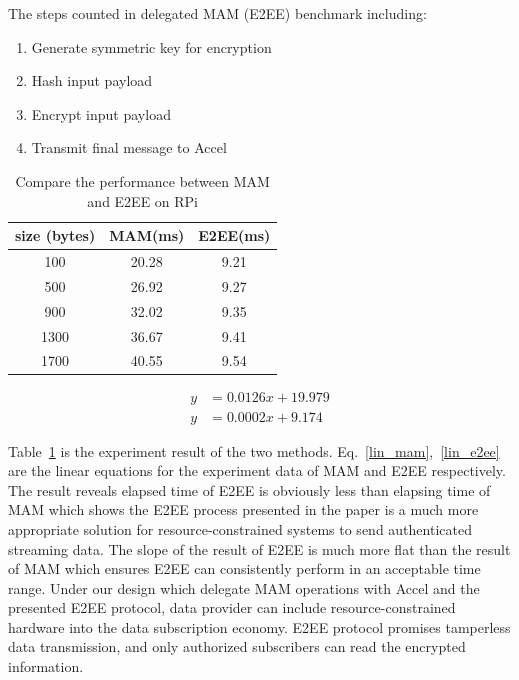 \documentclass[conference]{IEEEtran}
\begin{document}
The steps counted in delegated MAM (E2EE) benchmark including:
\begin{enumerate}
	\item Generate symmetric key for encryption
	\item Hash input payload
	\item Encrypt input payload
	\item Transmit final message to Accel
\end{enumerate}

\begin{table}[htbp]
	\caption{Compare the performance between MAM and E2EE on RPi}
    \label{tab:mam_vs_e2ee}
    \centering
        \begin{tabular}{|c||c|c|}
        \hline
            \textbf{size (bytes)} & \textbf{MAM(ms)} & \textbf{E2EE(ms)} \\
            \hline
            100 & 20.28 & 9.21 \\ 
            500 &  26.92 & 9.27 \\ 
            900 & 32.02 &  9.35  \\ 
            1300 & 36.67 & 9.41 \\ 
            1700 & 40.55 & 9.54 \\
            \hline
        \end{tabular}
\end{table}

\begin{align}
    y &= 0.0126 x+19.979 \label{lin_mam} \\
    y &= 0.0002 x+9.174 \label{lin_e2ee}
\end{align}

Table~\ref{tab:mam_vs_e2ee} is the experiment result of the two methods. Eq.~\ref{lin_mam},~\ref{lin_e2ee} are the linear equations for the experiment data of MAM and E2EE respectively. The result reveals elapsed time of E2EE is obviously less than elapsing time of MAM which shows the E2EE process presented in the paper is a much more appropriate solution for resource-constrained systems to send authenticated streaming data. The slope of the result of E2EE is much more flat than the result of MAM which ensures E2EE can consistently perform in an acceptable time range. Under our design which delegate MAM operations with Accel and the presented E2EE protocol, data provider can include resource-constrained hardware into the data subscription economy. E2EE protocol promises tamperless data transmission, and only authorized subscribers can read the encrypted information.
\end{document}
